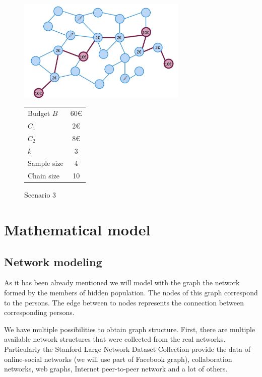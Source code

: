 \documentclass[12pt]{report}
\begin{document}
\begin{figure}[h]
  \begin{minipage}[c]{0.67\textwidth}
    \includegraphics[width=0.72\textwidth]{skipping3}
  \end{minipage}\hfill
  \begin{minipage}[c]{0.3\textwidth}
 	\caption{Scenario 3}
		
		\begin{tabular}{l c}
  			Budget $B$ & 60\euro \\
 		    $C_1$ & 2\euro \\
  		    $C_2$ & 8\euro \\
  		    $k$   & 3 \\
  		    Sample size  & 4 \\
		    Chain size   & 10 \\
		\end{tabular}	
  \end{minipage}
\end{figure}

\chapter{Mathematical model}

\section{Network modeling}

As it has been already mentioned we will model with the graph the network formed by the members of hidden population. The nodes of this graph correspond to the persons. The edge between to nodes represents the connection between corresponding persons.

We have multiple possibilities to obtain graph structure. First, there are multiple available network structures that were collected from the real networks. Particularly the Stanford Large Network Dataset Collection \cite{Facebook} provide the data of online-social networks (we will use part of Facebook graph), collaboration networks,  web graphs, Internet peer-to-peer network and a lot of others.
\end{document}
